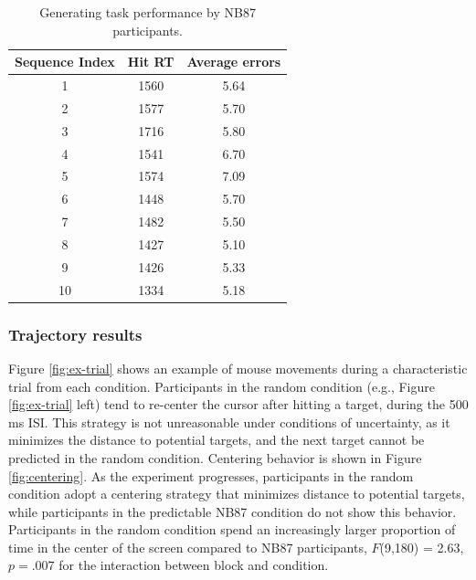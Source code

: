 \documentclass[man,floatsintext]{apa6}
\begin{document}
\begin{table}[h]
\begin{center} 
\caption{Generating task performance by NB87 participants.} 
\label{test-table} 
\vskip 0.12in
\begin{tabular}{c c c} 
\hline
Sequence Index  &  Hit RT  &  Average errors  \\ %
\hline
1  &  1560 &  5.64  \\
2  &  1577 &  5.70  \\
3  &  1716 &  5.80  \\
4  &  1541 &  6.70  \\ 
5  &  1574 &  7.09  \\ 
6  &  1448 &  5.70  \\ 
7  &  1482 &  5.50  \\ 
8  &  1427 &  5.10  \\ 
9  &  1426 &  5.33  \\ 
10 & 1334 &  5.18  \\
\hline
\end{tabular} 
\end{center} 
\end{table} 


\subsubsection{Trajectory results}

Figure \ref{fig:ex-trial} shows an example of mouse movements during a characteristic trial from each condition. Participants in the random condition (e.g., Figure \ref{fig:ex-trial} left) tend to re-center the cursor after hitting a target, during the 500 ms ISI. This strategy is not unreasonable under conditions of uncertainty, as it minimizes the distance to potential targets, and the next target cannot be predicted in the random condition. Centering behavior is shown in Figure \ref{fig:centering}. As the experiment progresses, participants in the random condition adopt a centering strategy that minimizes distance to potential targets, while participants in the predictable NB87 condition do not show this behavior. Participants in the random condition spend an increasingly larger proportion of time in the center of the screen compared to NB87 participants, $F$(9,180) = 2.63, $p = .007$ for the interaction between block and condition.
\end{document}
